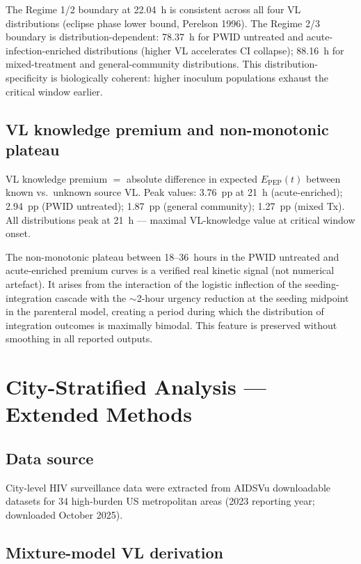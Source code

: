 \documentclass[11pt]{article}
\theoremstyle{definition}
\theoremstyle{remark}
\newcommand{\Epep}{E_{\text{PEP}}}
\begin{document}
The Regime 1/2 boundary at 22.04~h is consistent across all four VL distributions (eclipse phase lower bound, Perelson 1996). The Regime 2/3 boundary is distribution-dependent: 78.37~h for PWID untreated and acute-infection-enriched distributions (higher VL accelerates CI collapse); 88.16~h for mixed-treatment and general-community distributions. This distribution-specificity is biologically coherent: higher inoculum populations exhaust the critical window earlier.

\subsection{VL knowledge premium and non-monotonic plateau}

VL knowledge premium $=$ absolute difference in expected $\Epep(t)$ between known vs.\ unknown source VL. Peak values: 3.76~pp at 21~h (acute-enriched); 2.94~pp (PWID untreated); 1.87~pp (general community); 1.27~pp (mixed Tx). All distributions peak at 21~h --- maximal VL-knowledge value at critical window onset.

The non-monotonic plateau between 18--36~hours in the PWID untreated and acute-enriched premium curves is a verified real kinetic signal (not numerical artefact). It arises from the interaction of the logistic inflection of the seeding-integration cascade with the $\sim$2-hour urgency reduction at the seeding midpoint in the parenteral model, creating a period during which the distribution of integration outcomes is maximally bimodal. This feature is preserved without smoothing in all reported outputs.

\section{City-Stratified Analysis --- Extended Methods}

\subsection{Data source}

City-level HIV surveillance data were extracted from AIDSVu downloadable datasets for 34 high-burden US metropolitan areas (2023 reporting year; downloaded October 2025).

\subsection{Mixture-model VL derivation}
\end{document}
